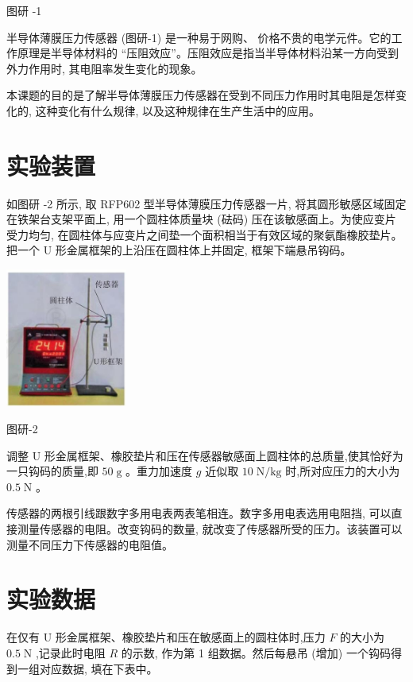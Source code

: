 \documentclass[10pt]{article}
\begin{document}
图研 -1

半导体薄膜压力传感器 (图研-1) 是一种易于网购、 价格不贵的电学元件。它的工作原理是半导体材料的 “压阻效应”。压阻效应是指当半导体材料沿某一方向受到外力作用时, 其电阻率发生变化的现象。

本课题的目的是了解半导体薄膜压力传感器在受到不同压力作用时其电阻是怎样变化的, 这种变化有什么规律, 以及这种规律在生产生活中的应用。

\section*{实验装置}

如图研 -2 所示, 取 RFP602 型半导体薄膜压力传感器一片, 将其圆形敏感区域固定在铁架台支架平面上, 用一个圆柱体质量块 (砝码) 压在该敏感面上。为使应变片受力均匀, 在圆柱体与应变片之间垫一个面积相当于有效区域的聚氨酯橡胶垫片。把一个 \(\mathrm{U}\) 形金属框架的上沿压在圆柱体上并固定, 框架下端悬吊钩码。

\begin{center}
\includegraphics[max width=0.3\textwidth]{images/01910e72-c5b7-7ed5-a6d4-fb3a5faefc32_116_883443.jpg}
\end{center}

图研-2

调整 \(\mathrm{U}\) 形金属框架、橡胶垫片和压在传感器敏感面上圆柱体的总质量,使其恰好为一只钩码的质量,即 \({50}\mathrm{\;g}\) 。重力加速度 \(g\) 近似取 \({10}\mathrm{\;N}/\mathrm{{kg}}\) 时,所对应压力的大小为 \({0.5}\mathrm{\;N}\) 。

传感器的两根引线跟数字多用电表两表笔相连。数字多用电表选用电阻挡, 可以直接测量传感器的电阻。改变钩码的数量, 就改变了传感器所受的压力。该装置可以测量不同压力下传感器的电阻值。

\section*{实验数据}

在仅有 \(\mathrm{U}\) 形金属框架、橡胶垫片和压在敏感面上的圆柱体时,压力 \(F\) 的大小为 \({0.5}\mathrm{\;N}\) ,记录此时电阻 \(R\) 的示数, 作为第 1 组数据。然后每悬吊 (增加) 一个钩码得到一组对应数据, 填在下表中。
\end{document}
